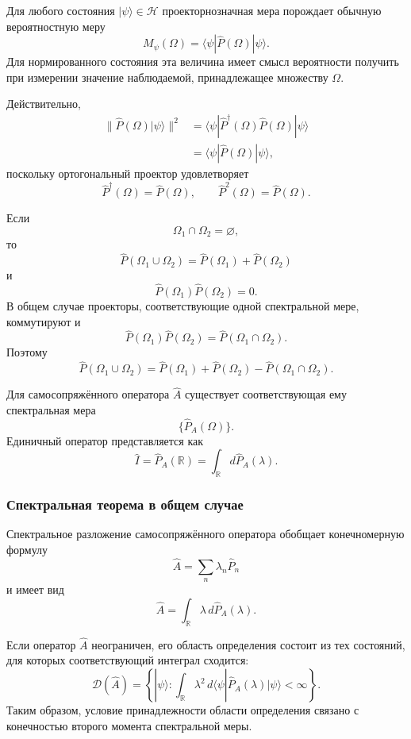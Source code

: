 \documentclass[12pt,a4paper]{article}
\begin{document}
Для любого состояния $|\psi\rangle\in\mathcal H$ проекторнозначная
мера порождает обычную вероятностную меру
\[
    \boxed{
        M_\psi(\Omega)
        =
        \langle\psi|\hat P(\Omega)|\psi\rangle
    }.
\]
Для нормированного состояния эта величина имеет смысл вероятности
получить при измерении значение наблюдаемой, принадлежащее множеству
$\Omega$.

Действительно,
\[
\begin{aligned}
    \|\hat P(\Omega)|\psi\rangle\|^2
    &=
    \langle\psi|
        \hat P^\dagger(\Omega)\hat P(\Omega)
    |\psi\rangle \\
    &=
    \langle\psi|\hat P(\Omega)|\psi\rangle,
\end{aligned}
\]
поскольку ортогональный проектор удовлетворяет
\[
    \hat P^\dagger(\Omega)=\hat P(\Omega),
    \qquad
    \hat P^2(\Omega)=\hat P(\Omega).
\]

Если
\[
    \Omega_1\cap\Omega_2=\varnothing,
\]
то
\[
    \hat P(\Omega_1\cup\Omega_2)
    =
    \hat P(\Omega_1)+\hat P(\Omega_2)
\]
и
\[
    \boxed{
        \hat P(\Omega_1)\hat P(\Omega_2)=0
    }.
\]
В общем случае проекторы, соответствующие одной спектральной мере,
коммутируют и
\[
    \boxed{
        \hat P(\Omega_1)\hat P(\Omega_2)
        =
        \hat P(\Omega_1\cap\Omega_2)
    }.
\]
Поэтому
\[
    \hat P(\Omega_1\cup\Omega_2)
    =
    \hat P(\Omega_1)+\hat P(\Omega_2)
    -
    \hat P(\Omega_1\cap\Omega_2).
\]

Для самосопряжённого оператора $\hat A$ существует соответствующая ему
спектральная мера
\[
    \{\hat P_A(\Omega)\}.
\]
Единичный оператор представляется как
\[
    \boxed{
        \hat I
        =
        \hat P_A(\mathbb R)
        =
        \int_{\mathbb R}d\hat P_A(\lambda)
    }.
\]


\subsubsection{Спектральная теорема в общем случае}

Спектральное разложение самосопряжённого оператора обобщает конечномерную
формулу
\[
    \hat A=\sum_n\lambda_n\hat P_n
\]
и имеет вид
\[
    \boxed{
        \hat A
        =
        \int_{\mathbb R}
            \lambda\,d\hat P_A(\lambda)
    }.
\]

Если оператор $\hat A$ неограничен, его область определения состоит из
тех состояний, для которых соответствующий интеграл сходится:
\[
    \boxed{
    \mathcal D(\hat A)
    =
    \left\{
        |\psi\rangle:
        \int_{\mathbb R}
            \lambda^2\,
            d\langle\psi|
                \hat P_A(\lambda)
            |\psi\rangle
        <\infty
    \right\}
    }.
\]
Таким образом, условие принадлежности области определения связано с
конечностью второго момента спектральной меры.
\end{document}
